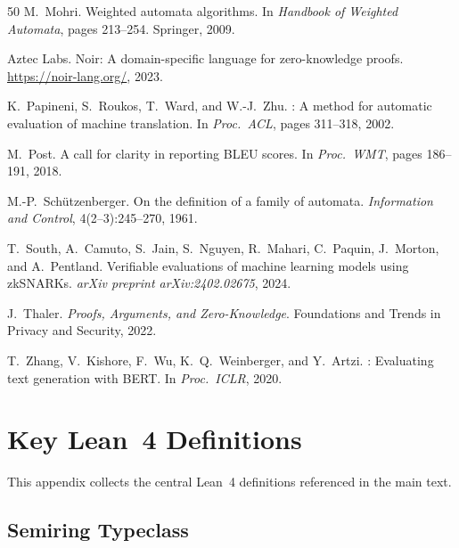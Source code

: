 \documentclass[11pt]{article}
\begin{document}
\begin{thebibliography}{50}
M.~Mohri.
\newblock Weighted automata algorithms.
\newblock In \emph{Handbook of Weighted Automata}, pages 213--254. Springer,
  2009.

Aztec Labs.
\newblock Noir: A domain-specific language for zero-knowledge proofs.
\newblock \url{https://noir-lang.org/}, 2023.

K.~Papineni, S.~Roukos, T.~Ward, and W.-J.~Zhu.
: A method for automatic evaluation of machine translation.
\newblock In \emph{Proc.\ ACL}, pages 311--318, 2002.

M.~Post.
\newblock A call for clarity in reporting {BLEU} scores.
\newblock In \emph{Proc.\ WMT}, pages 186--191, 2018.

M.-P.~Sch\"utzenberger.
\newblock On the definition of a family of automata.
\newblock \emph{Information and Control}, 4(2--3):245--270, 1961.

T.~South, A.~Camuto, S.~Jain, S.~Nguyen, R.~Mahari, C.~Paquin, J.~Morton,
  and A.~Pentland.
\newblock Verifiable evaluations of machine learning models using {zkSNARKs}.
\newblock \emph{arXiv preprint arXiv:2402.02675}, 2024.

J.~Thaler.
\newblock \emph{Proofs, Arguments, and Zero-Knowledge}.
\newblock Foundations and Trends in Privacy and Security, 2022.

T.~Zhang, V.~Kishore, F.~Wu, K.~Q.~Weinberger, and Y.~Artzi.
: Evaluating text generation with {BERT}.
\newblock In \emph{Proc.\ ICLR}, 2020.

\end{thebibliography}


\clearpage
\appendix

\section{Key Lean~4 Definitions}\label{app:definitions}

This appendix collects the central Lean~4 definitions referenced
in the main text.

\subsection{Semiring Typeclass}
\end{document}
